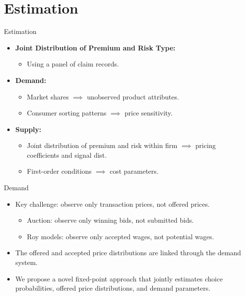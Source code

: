 \documentclass[10pt,aspectratio=169]{beamer}
\begin{document}
\section{Estimation}
 
\begin{frame}{Estimation}
    \begin{itemize}
        \item \textbf{Joint Distribution of Premium and Risk Type:}
        \begin{itemize}
            \item Using a panel of claim records.
        \end{itemize}
        
        \medskip
        \item \textbf{Demand:}
        \begin{itemize}
            \item Market shares $\implies$ unobserved product attributes.
            \item Consumer sorting patterns $\implies$ price sensitivity.
        \end{itemize}
        
        \medskip
        \item \textbf{Supply:}
        \begin{itemize}
            \item Joint distribution of premium and risk within firm $\implies$ pricing coefficients and signal dist.
            \item First-order conditions $\implies$ cost parameters.
        \end{itemize}
    \end{itemize}
\end{frame}

\begin{frame}{Demand}
    \begin{itemize}
        \item Key challenge: observe only transaction prices, not offered prices.
        \begin{itemize}
            \item Auction: observe only winning bids, not submitted bids.
            \item Roy models: observe only accepted wages, not potential wages.
        \end{itemize}
        
        \medskip
        \item The offered and accepted price distributions are linked through the demand system.
        
        \medskip
        \item We propose a novel fixed-point approach that jointly estimates choice probabilities, offered price distributions, and demand parameters.
    \end{itemize}
\end{frame}
\end{document}
